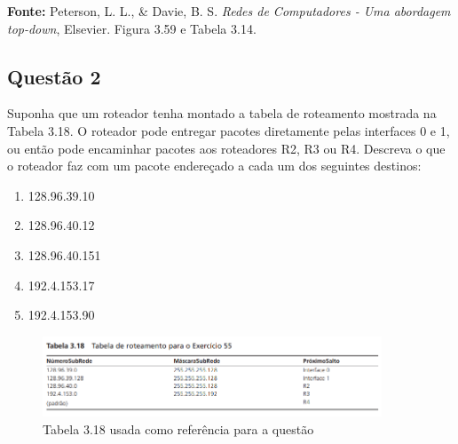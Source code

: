 \vspace{0.5cm}
\textbf{Fonte:} Peterson, L. L., \& Davie, B. S. \textit{Redes de Computadores - Uma abordagem top-down}, Elsevier. Figura 3.59 e Tabela 3.14.

\subsection{Questão 2}
Suponha que um roteador tenha montado a tabela de roteamento mostrada na Tabela 3.18. O
roteador pode entregar pacotes diretamente pelas interfaces 0 e 1, ou então pode encaminhar
pacotes aos roteadores R2, R3 ou R4. Descreva o que o roteador faz com um pacote endereçado a
cada um dos seguintes destinos:

\begin{enumerate}[label=\alph*.]
    \item 128.96.39.10
    \item 128.96.40.12
    \item 128.96.40.151
    \item 192.4.153.17
    \item 192.4.153.90
\end{enumerate}

\begin{figure}[H]
    \centering
    \includegraphics[width=0.9\textwidth]{images/tabela_3_18.png}
    \caption{Tabela 3.18 usada como referência para a questão} 
    \label{fig:questao_2_tabela}
\end{figure}

